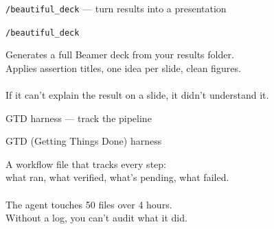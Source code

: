 \documentclass[aspectratio=169,11pt]{beamer}
\begin{document}
\begin{frame}{\texttt{/beautiful\_deck} --- turn results into a presentation}
\vspace{1.0em}
\begin{center}
\large\texttt{/beautiful\_deck}
\end{center}
\vspace{0.6em}
\begin{center}\normalsize\color{warmgray}
Generates a full Beamer deck from your results folder.\\[0.4em]
Applies assertion titles, one idea per slide, clean figures.\\[0.6em]
\\[0.4em]
\small If it can't explain the result on a slide, it didn't understand it.
\end{center}
\end{frame}

\begin{frame}{GTD harness --- track the pipeline}
\vspace{1.0em}
\begin{center}
\large GTD (Getting Things Done) harness
\end{center}
\vspace{0.6em}
\begin{center}\normalsize\color{warmgray}
A workflow file that tracks every step:\\[0.4em]
what ran, what verified, what's pending, what failed.\\[0.6em]
\\[0.4em]
\small The agent touches 50 files over 4 hours.\\
Without a log, you can't audit what it did.
\end{center}
\end{frame}

\end{document}
